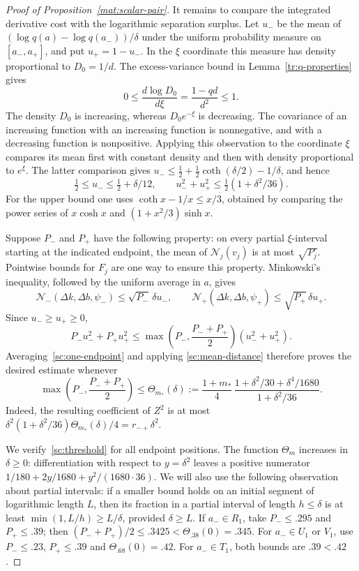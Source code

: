 \documentclass[11pt]{article}
\theoremstyle{definition}
\theoremstyle{remark}
\numberwithin{equation}{section}
\begin{document}
\begin{proof}[Proof of Proposition~\ref{mat:scalar-pair}]
It remains to compare the integrated derivative cost with the logarithmic
separation surplus.  Let $u_-$ be the mean of
$(\log q(a)-\log q(a_-))/\delta$ under the uniform probability measure
on $[a_-,a_+]$, and put $u_+=1-u_-$.  In the $\xi$ coordinate this measure
has density proportional to $D_0=1/d$.  The excess-variance bound in
Lemma~\ref{tr:q-properties} gives
\[
 0\le \frac{d\log D_0}{d\xi}=\frac{1-qd}{d^2}\le1.
\]
The density $D_0$ is increasing, whereas $D_0e^{-\xi}$ is decreasing.
The covariance of an increasing function with an increasing function is
nonnegative, and with a decreasing function is nonpositive. Applying this
observation to the coordinate $\xi$ compares its mean first with constant
density and then with density proportional to $e^\xi$. The latter comparison
gives
$u_-\le\tfrac12+\tfrac12\coth(\delta/2)-1/\delta$, and hence
\begin{equation}\label{sc:mean-distance}
 \tfrac12\le u_-\le\tfrac12+\delta/12,
 \qquad u_-^2+u_+^2\le\tfrac12(1+\delta^2/36).
\end{equation}
For the upper bound one uses $\coth x-1/x\le x/3$, obtained by comparing
the power series of $x\cosh x$ and $(1+x^2/3)\sinh x$.

Suppose $P_-$ and $P_+$ have the following property: on every partial
$\xi$-interval starting at the indicated endpoint, the mean of
$\mathcal N_j(v_j)$ is at most $\sqrt{P_j}$.  Pointwise bounds for $F_j$
are one way to ensure this property.  Minkowski's inequality, followed by
the uniform average in $a$, gives
\[
 \mathcal N_-(\Delta k,\Delta b,\psi_-)\le\sqrt{P_-}\,\delta u_-,
 \qquad
 \mathcal N_+(\Delta k,\Delta b,\psi_+)\le\sqrt{P_+}\,\delta u_+.
\]
Since $u_-\ge u_+\ge0$,
\[
 P_-u_-^2+P_+u_+^2
 \le\max\left(P_-,\frac{P_-+P_+}{2}\right)(u_-^2+u_+^2).
\]
Averaging~\eqref{sc:one-endpoint} and applying
\eqref{sc:mean-distance} therefore proves the desired estimate whenever
\begin{equation}\label{sc:threshold}
 \max\left(P_-,\frac{P_-+P_+}{2}\right)\le
 \Theta_{m_*}(\delta):=
 \frac{1+m_*}{4}\,
 \frac{1+\delta^2/30+\delta^4/1680}{1+\delta^2/36}.
\end{equation}
Indeed, the resulting coefficient of $Z^2$ is at most
$\delta^2(1+\delta^2/36)\Theta_{m_*}(\delta)/4
=r_{-+}\delta^2$.

We verify~\eqref{sc:threshold} for all endpoint positions.  The function
$\Theta_m$ increases in $\delta\ge0$: differentiation with respect to
$y=\delta^2$ leaves a positive numerator
$1/180+2y/1680+y^2/(1680\cdot36)$.
We will also use the following observation about partial intervals:
if a smaller bound holds on an initial segment of logarithmic length $L$,
then its fraction in a partial interval of length $h\le\delta$ is at least
$\min(1,L/h)\ge L/\delta$, provided $\delta\ge L$.
If $a_-\in R_1$, take $P_-\le.295$ and $P_+\le.39$;
then $(P_-+P_+)/2\le.3425<\Theta_{.38}(0)=.345$.
For $a_-\in U_1$ or $V_1$, use $P_-\le.23$, $P_+\le.39$ and
$\Theta_{.68}(0)=.42$.  For $a_-\in T_1$, both bounds are $.39<.42$.


\end{proof}
\end{document}
